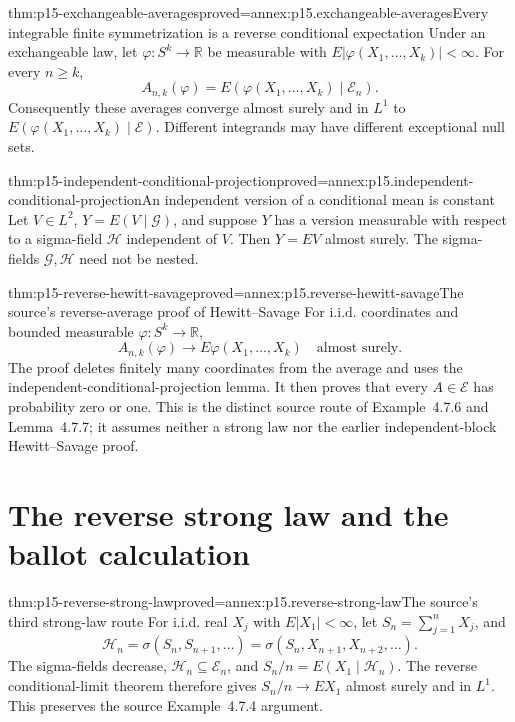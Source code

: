\begin{hbtheorem}{thm:p15-exchangeable-averages}{proved=annex:p15.exchangeable-averages}{Every integrable finite symmetrization is a reverse conditional expectation}
Under an exchangeable law, let
\(\varphi:S^k\to\mathbb R\) be measurable with
\(E|\varphi(X_1,\ldots,X_k)|<\infty\).
For every \(n\geq k\),
\[
 A_{n,k}(\varphi)=E(\varphi(X_1,\ldots,X_k)\mid\mathcal E_n).
\]
Consequently these averages converge almost surely and in \(L^1\) to
\(E(\varphi(X_1,\ldots,X_k)\mid\mathcal E)\).
Different integrands may have different exceptional null sets.
\end{hbtheorem}

\begin{hblemma}{thm:p15-independent-conditional-projection}{proved=annex:p15.independent-conditional-projection}{An independent version of a conditional mean is constant}
Let \(V\in L^2\), \(Y=E(V\mid\mathcal G)\), and suppose \(Y\)
has a version measurable with respect to a sigma-field \(\mathcal H\)
independent of \(V\). Then \(Y=EV\) almost surely.
The sigma-fields \(\mathcal G,\mathcal H\) need not be nested.
\end{hblemma}

\begin{hbtheorem}{thm:p15-reverse-hewitt-savage}{proved=annex:p15.reverse-hewitt-savage}{The source's reverse-average proof of Hewitt--Savage}
For i.i.d. coordinates and bounded measurable \(\varphi:S^k\to\mathbb R\),
\[
                A_{n,k}(\varphi)\longrightarrow
                     E\varphi(X_1,\ldots,X_k)\quad\text{almost surely}.
\]
The proof deletes finitely many coordinates from the average and
uses the independent-conditional-projection lemma.
It then proves that every \(A\in\mathcal E\) has probability zero or one.
This is the distinct source route of Example~4.7.6 and Lemma~4.7.7;
it assumes neither a strong law nor the earlier independent-block
Hewitt--Savage proof.
\end{hbtheorem}

\section{The reverse strong law and the ballot calculation}

\begin{hbtheorem}{thm:p15-reverse-strong-law}{proved=annex:p15.reverse-strong-law}{The source's third strong-law route}
For i.i.d. real \(X_j\) with \(E|X_1|<\infty\), let
\(S_n=\sum_{j=1}^nX_j\), and
\[
 \mathcal H_n=\sigma(S_n,S_{n+1},\ldots)
             =\sigma(S_n,X_{n+1},X_{n+2},\ldots).
\]
The sigma-fields decrease, \(\mathcal H_n\subseteq\mathcal E_n\),
and \(S_n/n=E(X_1\mid\mathcal H_n)\).
The reverse conditional-limit theorem therefore gives
\(S_n/n\to EX_1\) almost surely and in \(L^1\).
This preserves the source Example~4.7.4 argument.
\end{hbtheorem}

